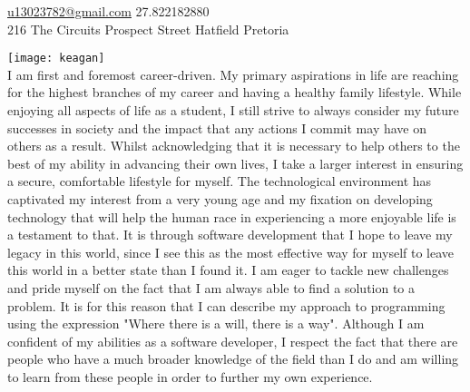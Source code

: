 

\sloppy  %



\nobreakvspace{0.3em}  %

\noindent\href{mailto:u13023782.at.gmail.dot.com}{u13023782\mbox{}@\mbox{}gmail.com}\sbull
\textsmaller{+}27.822182880\sbull
\\
216 The Circuits Prospect Street\sbull
Hatfield\sbull
Pretoria\\

\spacedhrule{0.9em}{-0.4em}  %
\begin{center}
\end{center}


\vspace{-1.3em}  %
\begin{multicols}{3}%

\noindent \texttt{[image: keagan]}\\I am first and foremost career-driven. My primary aspirations in life are reaching for the highest branches of my career and having a healthy family lifestyle. While enjoying all aspects of life as a student, I still strive to always consider my future successes in society and the impact that any actions I commit may have on others as a result. Whilst acknowledging that it is necessary to help others to the best of my ability in advancing their own lives, I take a larger interest in ensuring a secure, comfortable lifestyle for myself. The technological environment has captivated my interest from a very young age and my fixation on developing technology that will help the human race in experiencing a more enjoyable life is a testament to that. It is through software development that I hope to leave my legacy in this world, since I see this as the most effective way for myself to leave this world in a better state than I found it. I am eager to tackle new challenges and pride myself on the fact that I am always able to find a solution to a problem. It is for this reason that I can describe my approach to programming using the expression "Where there is a will, there is a way". Although I am confident of my abilities as a software developer, I respect the fact that there are people who have a much broader knowledge of the field than I do and am willing to learn from these people in order to further my own experience.
\end{multicols}

